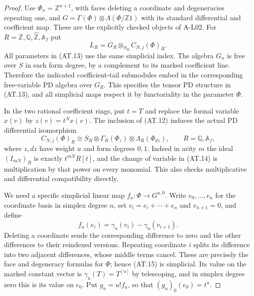 \begin{proof}
Use $\Phi_n=\mathbb Z^{n+1}$, with faces deleting a
coordinate and degeneracies repeating one, and
$G=\Gamma(\Phi)\otimes\Lambda(\Phi/\mathbb Z1)$
with its standard differential and coefficient map.
These are the explicitly checked objects of A-L02.
For $R=\mathbb Z,\mathbb Q,\widehat{\mathbb Z},\mathbb A_f$
put
\[
 L_R=G_R\otimes_{S_R} C_{N,j}(\Phi)_R.
 \tag{AT.13}
\]
All parameters in (AT.13) use the same simplicial
index. The algebra $G_n$ is free over $S$ in each
form degree, by a complement to its marked coefficient
line. Therefore the indicated coefficient-tail
submodules embed in the corresponding free-variable
PD algebra over $G_R$. This specifies the tensor PD
structure in (AT.13), and all simplicial maps respect
it by functoriality in the parameter $\Phi$.

In the two rational coefficient rings, put $t=T$ and
replace the formal variable $x(v)$ by
$z(v)=t^N x(v)$. The inclusion of (AT.12) induces the
actual PD differential isomorphism
\[
 C_{N,j}(\Phi)_R
   \cong S_R\otimes\Gamma_R(\Phi_z)
                    \otimes\Lambda_R(\Phi_{dz}),
 \qquad R=\mathbb Q,\mathbb A_f,
 \tag{AT.14}
\]
where $z,dz$ have weight $u$ and form degrees $0,1$.
Indeed in arity $m$ the ideal $(I_{mN})_R$ is exactly
$t^{mN}R[t]$, and the change of variable in (AT.14)
is multiplication by that power on every monomial.
This also checks multiplicative and differential
compatibility directly.

We need a specific simplicial linear map
$f_u:\Phi\to G^{u,0}$. Write $e_0,\ldots,e_n$ for
the coordinate basis in simplex degree $n$, set
$v_i=e_i+\cdots+e_n$ and $v_{n+1}=0$, and define
\[
 f_u(e_i)=\gamma_u(v_i)-\gamma_u(v_{i+1}).
 \tag{AT.15}
\]
Deleting a coordinate sends the corresponding
difference to zero and the other differences to
their reindexed versions. Repeating coordinate $i$
splits its difference into two adjacent differences,
whose middle terms cancel. These are precisely the
face and degeneracy formulas for $\Phi$; hence
(AT.15) is simplicial. Its value on the marked
constant vector is $\gamma_u(T)=T^{[u]}$ by
telescoping, and in simplex degree zero this is its
value on $e_0$. Put $g_u=u!f_u$, so that
$(g_u)_0(e_0)=t^u$.


\end{proof}
